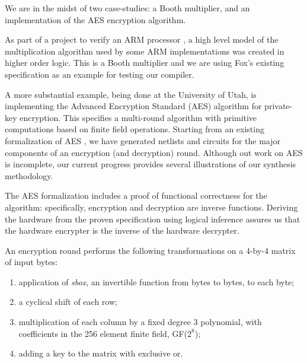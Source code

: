 

We are in the midst of two case-studies: a Booth multiplier, and an implementation
of the AES encryption algorithm.

As part of a project to verify an ARM processor \cite{Fox02}, a high
level model of the multiplication algorithm used by some ARM
implementations was created in higher order logic. This is a Booth
multiplier and we are using Fox's existing specification as an example
for testing our compiler. 


A more substantial example, being done at the University of Utah, is
implementing the Advanced Encryption Standard (AES) \cite{AES}
algorithm for private-key encryption. This specifies a multi-round
algorithm with primitive computations based on finite field
operations.  Starting from an existing formalization of AES
\cite{slind:aes}, we have generated netlists and circuits for the major
components of an encryption (and decryption) round.  Although out work on AES
is incomplete, our current progress provides several illustrations of our
synthesis methodology.

The AES formalization includes a proof of functional correctness  for the
algorithm: specifically, encryption and decryption are inverse functions.
Deriving the hardware from the proven specification using logical inference
assures us that the hardware encrypter is the inverse of the hardware
decrypter.

An encryption round performs the following transformations on a 4-by-4 matrix
of input bytes:
\begin{enumerate}
\item
application of \emph{sbox}, an invertible function from bytes to bytes,
to each byte;
\item
a cyclical shift of each row;
\item
multiplication of each column by a fixed degree 3 polynomial, with coefficients
in the 256 element finite field, GF($2^8$);
\item
adding a key to the matrix with exclusive or.
\end{enumerate}


